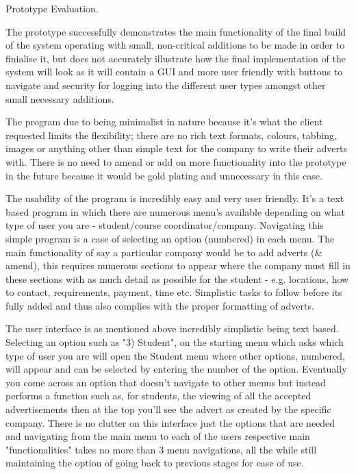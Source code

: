 Prototype Evaluation.

The prototype successfully demonstrates the main functionality of the final build of the system operating with small, non-critical additions to be made in order to finialise it, but does not accurately illustrate how the final implementation of the system will look as it will contain a GUI and more user friendly with buttons to navigate and security for logging into the different user types amongst other small necessary additions.

The program due to being minimalist in nature because it's what the client requested limits the flexibility; there are no rich text formats, colours, tabbing, images or anything other than simple text for the company to write their adverts with. There is no need to amend or add on more functionality into the prototype in the future because it would be gold plating and unnecessary in this case.

The usability of the program is incredibly easy and very user friendly. It's a text based program in which there are numerous menu's available depending on what type of user you are - student/course coordinator/company. Navigating this simple program is a case of selecting an option (numbered) in each menu. The main functionality of say a particular company would be to add adverts (& amend), this requires numerous sections to appear where the company must fill in these sections with as much detail as possible for the student - e.g. locations, how to contact, requirements, payment, time etc. Simplistic tasks to follow before its fully added and thus also complies with the proper formatting of adverts.

The user interface is as mentioned above incredibly simplistic being text based. Selecting an option such as "3) Student", on the starting menu which asks which type of user you are will open the Student menu where other options, numbered, will appear and can be selected by entering the number of the option. Eventually you come across an option that doesn't navigate to other menus but instead performs a function such as, for students, the viewing of all the accepted advertisements then at the top you'll see the advert as created by the specific company. There is no clutter on this interface just the options that are needed and navigating from the main menu to each of the users respective main "functionalities" takes no more than 3 menu navigations, all the while still maintaining the option of going back to previous stages for ease of use.

